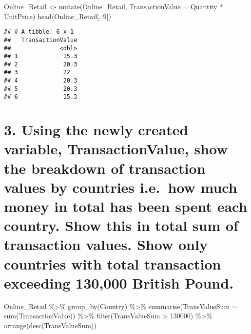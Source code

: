 \documentclass[
]{article}
\newenvironment{Shaded}{\begin{snugshade}}{\end{snugshade}}
\newcommand{\AttributeTok}[1]{\textcolor[rgb]{0.77,0.63,0.00}{#1}}
\newcommand{\DecValTok}[1]{\textcolor[rgb]{0.00,0.00,0.81}{#1}}
\newcommand{\FunctionTok}[1]{\textcolor[rgb]{0.00,0.00,0.00}{#1}}
\newcommand{\NormalTok}[1]{#1}
\newcommand{\OtherTok}[1]{\textcolor[rgb]{0.56,0.35,0.01}{#1}}
\newcommand{\SpecialCharTok}[1]{\textcolor[rgb]{0.00,0.00,0.00}{#1}}
\begin{document}
\begin{Shaded}
\begin{Highlighting}[]
\NormalTok{Online\_Retail }\OtherTok{\textless{}{-}} \FunctionTok{mutate}\NormalTok{(Online\_Retail, }\AttributeTok{TransactionValue =}\NormalTok{ Quantity }\SpecialCharTok{*}\NormalTok{ UnitPrice)}
\FunctionTok{head}\NormalTok{(Online\_Retail[, }\DecValTok{9}\NormalTok{])}
\end{Highlighting}
\end{Shaded}

\begin{verbatim}
## # A tibble: 6 x 1
##   TransactionValue
##              <dbl>
## 1             15.3
## 2             20.3
## 3             22  
## 4             20.3
## 5             20.3
## 6             15.3
\end{verbatim}

\hypertarget{using-the-newly-created-variable-transactionvalue-show-the-breakdown-of-transaction-values-by-countries-i.e.-how-much-money-in-total-has-been-spent-each-country.-show-this-in-total-sum-of-transaction-values.-show-only-countries-with-total-transaction-exceeding-130000-british-pound.}{%
\section{3. Using the newly created variable, TransactionValue, show the
breakdown of transaction values by countries i.e.~how much money in
total has been spent each country. Show this in total sum of transaction
values. Show only countries with total transaction exceeding 130,000
British
Pound.}\label{using-the-newly-created-variable-transactionvalue-show-the-breakdown-of-transaction-values-by-countries-i.e.-how-much-money-in-total-has-been-spent-each-country.-show-this-in-total-sum-of-transaction-values.-show-only-countries-with-total-transaction-exceeding-130000-british-pound.}}

\begin{Shaded}
\begin{Highlighting}[]
\NormalTok{Online\_Retail }\SpecialCharTok{\%\textgreater{}\%}
\FunctionTok{group\_by}\NormalTok{(Country) }\SpecialCharTok{\%\textgreater{}\%} 
  \FunctionTok{summarise}\NormalTok{(}\AttributeTok{TransValueSum =} \FunctionTok{sum}\NormalTok{(TransactionValue)) }\SpecialCharTok{\%\textgreater{}\%} \FunctionTok{filter}\NormalTok{(TransValueSum }\SpecialCharTok{\textgreater{}} \DecValTok{130000}\NormalTok{) }\SpecialCharTok{\%\textgreater{}\%} \FunctionTok{arrange}\NormalTok{(}\FunctionTok{desc}\NormalTok{(TransValueSum))}
\end{Highlighting}
\end{Shaded}
\end{document}
